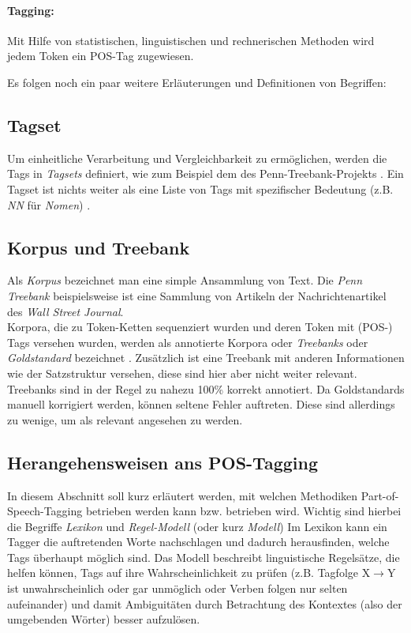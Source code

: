 \paragraph{Tagging:} Mit Hilfe von statistischen, linguistischen und rechnerischen Methoden wird jedem Token ein POS-Tag zugewiesen. 

Es folgen noch ein paar weitere Erläuterungen und Definitionen von Begriffen:

\subsection{Tagset}
\label{sec:related:pos:tagset}

Um einheitliche Verarbeitung und Vergleichbarkeit zu ermöglichen, werden die Tags in \textit{Tagsets} definiert, wie zum Beispiel dem des Penn-Treebank-Projekts \linebreak \cite{Web:PennBank} \cite{Paper:PennBank}. Ein Tagset ist nichts weiter als eine Liste von Tags mit spezifischer Bedeutung (z.B. \textit{NN} für \textit{Nomen}) \cite{halteren}.

\subsection{Korpus und Treebank}
\label{sec:related:pos:corpus}

Als \textit{Korpus} bezeichnet man eine simple Ansammlung von Text. Die \textit{Penn Treebank} \cite{Paper:PennBank} beispielsweise ist eine Sammlung von Artikeln der Nachrichtenartikel des \textit{Wall Street Journal}.
\\
Korpora, die zu Token-Ketten sequenziert wurden und deren Token mit (POS-) Tags versehen wurden, werden als annotierte Korpora oder \textit{Treebanks} oder \textit{Goldstandard} bezeichnet \cite{halteren}. Zusätzlich ist eine Treebank mit anderen Informationen wie der Satzstruktur versehen, diese sind hier aber nicht weiter relevant. Treebanks sind in der Regel zu nahezu 100\% korrekt annotiert. Da Goldstandards manuell korrigiert werden, können seltene Fehler auftreten. Diese sind allerdings zu wenige, um als relevant angesehen zu werden.

\subsection{Herangehensweisen ans POS-Tagging}
In diesem Abschnitt soll kurz erläutert werden, mit welchen Methodiken Part-of-Speech-Tagging betrieben werden kann bzw. betrieben wird. Wichtig sind hierbei die Begriffe \textit{Lexikon} und \textit{Regel-Modell} (oder kurz \textit{Modell}) \cite{Smith} \cite{Eynde} Im Lexikon kann ein Tagger die auftretenden Worte nachschlagen und dadurch herausfinden, welche Tags überhaupt möglich sind. Das Modell beschreibt linguistische Regelsätze, die helfen können, Tags auf ihre Wahrscheinlichkeit zu prüfen (z.B. \glqq Tagfolge X$\rightarrow$Y ist unwahrscheinlich oder gar unmöglich\grqq{} oder \glqq Verben folgen nur selten aufeinander\grqq{}) und damit Ambiguitäten durch Betrachtung des Kontextes (also der umgebenden Wörter) besser aufzulösen.

